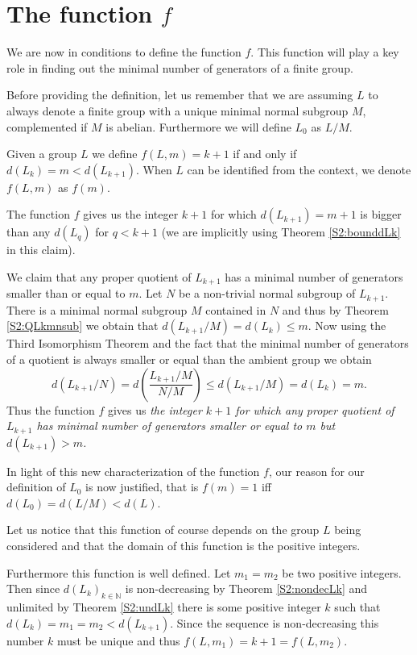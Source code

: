 \section{The function \texorpdfstring{$f$}{f}}

We are now in conditions to define the function $f$. This function will play a key role in finding out the minimal number of generators of a finite group.

Before providing the definition, let us remember that we are assuming $L$ to always denote a finite group with a unique minimal normal subgroup $M$, complemented if $M$ is abelian. Furthermore we will define $L_0$ as $L/M$.

\begin{definition}
    Given a group $L$ we define $f(L, m) = k+1$ if and only if $d(L_k) = m < d(L_{k+1})$. When $L$ can be identified from the context, we denote $f(L,m)$ as $f(m)$.
\end{definition}

The function $f$ gives us the integer $k+1$ for which $d(L_{k+1}) = m + 1$ is bigger than any $d(L_q)$ for $q < k+1$ (we are implicitly using Theorem \ref{S2:bounddLk} in this claim). 

We claim that any proper quotient of $L_{k+1}$ has a minimal number of generators smaller than or equal to $m$. 
Let $N$ be a non-trivial normal subgroup of $L_{k+1}$. 
There is a minimal normal subgroup $M$ contained in $N$ and  thus by Theorem \ref{S2:QLkmnsub} we obtain that $d(L_{k+1} / M) = d(L_k) \le m$. 
Now using the Third Isomorphism Theorem and the fact that the minimal number of generators of a quotient is always smaller or equal than the ambient group we obtain
$$
d(L_{k+1}/N) = d(\frac{L_{k+1}/M}{N/M}) \le d(L_{k+1} / M) = d(L_k) = m.
$$
Thus the function $f$ gives us \textit{the integer $k+1$ for which any proper quotient of $L_{k+1}$ has minimal number of generators smaller or equal to $m$ but $d(L_{k+1}) > m$.}

In light of this new characterization of the function $f$, our reason for our definition of $L_0$ is now justified, that is $f(m) = 1$ iff $d(L_0) = d(L/M) < d(L)$. 

Let us notice that this function of course depends on the group $L$ being considered and that the domain of this function is the positive integers. 

Furthermore this function is well defined. Let $m_1 = m_2$ be two positive integers. Then since $d(L_k)_{k \in \mathbb{N}}$ is non-decreasing by Theorem \ref{S2:nondecLk} and unlimited by Theorem \ref{S2:undLk} there is some positive integer $k$ such that $d(L_k) = m_1 = m_2 < d(L_{k+1})$. Since the sequence is non-decreasing this number $k$ must be unique and thus $f(L,m_1) = k+1 = f(L,m_2)$.